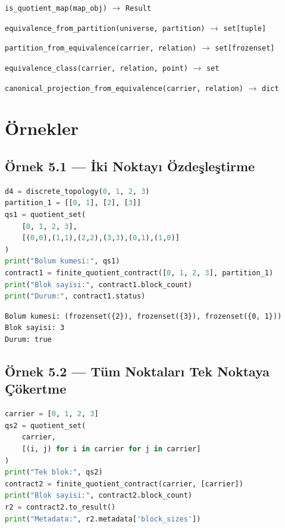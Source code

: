 \texttt{is\_quotient\_map(map\_obj)} $\to$ \texttt{Result}

\texttt{equivalence\_from\_partition(universe, partition)} $\to$ \texttt{set[tuple]}

\texttt{partition\_from\_equivalence(carrier, relation)} $\to$ \texttt{set[frozenset]}

\texttt{equivalence\_class(carrier, relation, point)} $\to$ \texttt{set}

\texttt{canonical\_projection\_from\_equivalence(carrier, relation)} $\to$ \texttt{dict}

\section{Örnekler}

\subsection*{Örnek 5.1 — İki Noktayı Özdeşleştirme}

\begin{lstlisting}[language=Python]
d4 = discrete_topology(0, 1, 2, 3)
partition_1 = [[0, 1], [2], [3]]
qs1 = quotient_set(
    [0, 1, 2, 3],
    [(0,0),(1,1),(2,2),(3,3),(0,1),(1,0)]
)
print("Bolum kumesi:", qs1)
contract1 = finite_quotient_contract([0, 1, 2, 3], partition_1)
print("Blok sayisi:", contract1.block_count)
print("Durum:", contract1.status)
\end{lstlisting}

\begin{verbatim}
Bolum kumesi: (frozenset({2}), frozenset({3}), frozenset({0, 1}))
Blok sayisi: 3
Durum: true
\end{verbatim}

\subsection*{Örnek 5.2 — Tüm Noktaları Tek Noktaya Çökertme}

\begin{lstlisting}[language=Python]
carrier = [0, 1, 2, 3]
qs2 = quotient_set(
    carrier,
    [(i, j) for i in carrier for j in carrier]
)
print("Tek blok:", qs2)
contract2 = finite_quotient_contract(carrier, [carrier])
print("Blok sayisi:", contract2.block_count)
r2 = contract2.to_result()
print("Metadata:", r2.metadata['block_sizes'])
\end{lstlisting}

